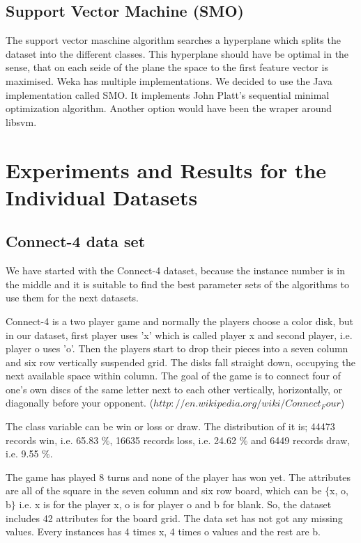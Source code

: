\documentclass[a4paper]{article}
\begin{document}
    \subsection{Support Vector Machine (SMO)}
    The support vector maschine algorithm searches a hyperplane which splits the
    dataset into the different classes. This hyperplane should have be optimal
    in the sense, that on each seide of the plane the space to the first feature
    vector is maximised. Weka has multiple implementations. We decided to use
    the Java implementation called SMO. It implements John Platt's sequential
    minimal optimization algorithm. Another option would have been the
    wraper around libsvm.

\section{Experiments and Results for the Individual Datasets}

\subsection{Connect-4 data set}

We have started with the Connect-4 dataset, because the instance number is in
the middle and it is suitable to find the best parameter sets of the algorithms
to use them for the next datasets.

Connect-4 is a two player game and normally the players choose a color disk,
but in our dataset, first player uses 'x' which is called player x and second
player, i.e. player o uses 'o'. Then the players start to drop their pieces
into a seven column and six row vertically suspended grid. The disks fall
straight down, occupying the next available space within column. The goal of
the game is to connect four of one's own discs of the same letter next to each
other vertically, horizontally, or diagonally before your opponent.
($http://en.wikipedia.org/wiki/Connect_Four$) 

The class variable can be win or loss or draw. The distribution of it is; 44473
records win, i.e. 65.83 $\%$, 16635 records loss,  i.e. 24.62 $\%$ and 6449
records draw,  i.e. 9.55 $\%$.

The game has played 8 turns and none of the player has won yet. The attributes
are all of the square in the seven column and six row board, which can be
$\{$x, o, b$\}$ i.e. x is for the player x, o is for player o and b for blank.
So, the dataset includes 42 attributes for the board grid. The data set has not
got any missing values. Every instances has 4 times x, 4 times o values and the
rest are b. 
\end{document}
